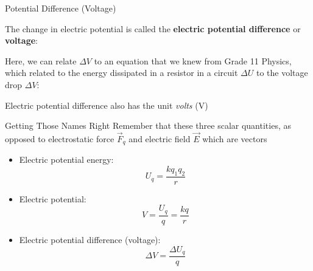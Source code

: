 \documentclass[12pt,aspectratio=169]{beamer}
\begin{document}
%
%
%  



\begin{frame}{Potential Difference (Voltage)}

  The change in electric potential is called the
  \textbf{electric potential difference} or \textbf{voltage}:


  Here, we can relate $\Delta V$ to an equation that we knew from Grade 11
  Physics, which related to the energy dissipated in a resistor in a circuit
  $\Delta U$ to the voltage drop $\Delta V$:
    

  Electric potential difference also has the unit \emph{volts} (\si{\volt})
\end{frame}



\begin{frame}{Getting Those Names Right}
  Remember that these three scalar quantities, as opposed to electrostatic
  force $\vec F_q$ and electric field $\vec E$ which are vectors
  \begin{itemize}
  \item Electric potential energy:
    \begin{displaymath}
      U_q=\frac{kq_1q_2}r
    \end{displaymath}
  \item Electric potential:
    \begin{displaymath}
      V=\frac{U_q}q=\frac{kq}r
    \end{displaymath}
  \item Electric potential difference (voltage):
    \begin{displaymath}
      \Delta V=\frac{\Delta U_q}q
    \end{displaymath}
  \end{itemize}
\end{frame}
\end{document}

